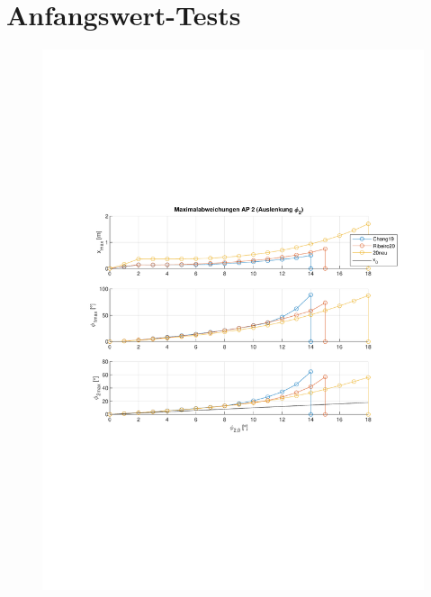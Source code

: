 \section{Anfangswert-Tests}\label{sec:x0test}

\begin{figure}
	\centering
	\begin{minipage}[t]{0.45\linewidth}
		\centering
		\includegraphics[scale=0.47]{Bilder/Parameter neu (Ribeiro) Creg off/AP2.pdf}
		\label{fig:ap2}
	\end{minipage}
	\quad
	\begin{minipage}[t]{0.45\linewidth}
		\centering

\end{minipage}
\end{figure}
